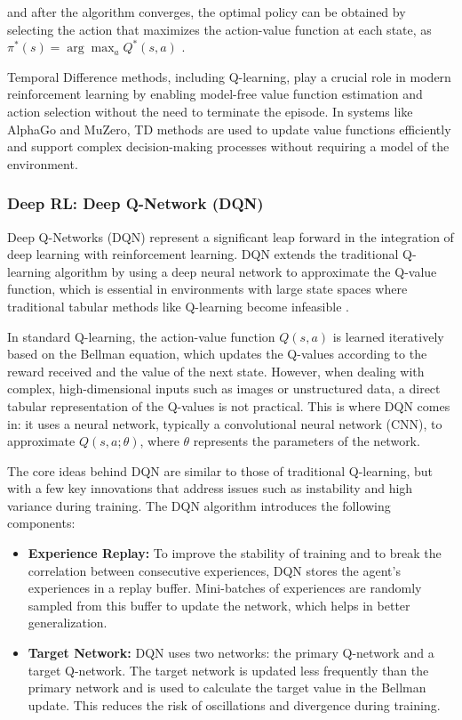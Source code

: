 and after the algorithm converges, the optimal policy can be obtained by
selecting the action that maximizes the action-value function at each state, as
$\pi^*(s) = \arg\max_a Q^*(s, a)$ \cite{bg2}.

Temporal Difference methods, including Q-learning, play a crucial role in
modern reinforcement learning by enabling model-free value function estimation
and action selection without the need to terminate the episode. In systems like
AlphaGo and MuZero, TD methods are used to update value functions efficiently
and support complex decision-making processes without requiring a model of the
environment\cite{bg2}.

\subsubsection{\textbf{Deep RL: Deep Q-Network (DQN)}}

Deep Q-Networks (DQN) represent a significant leap forward in the integration
of deep learning with reinforcement learning. DQN extends the traditional
Q-learning algorithm by using a deep neural network to approximate the Q-value
function, which is essential in environments with large state spaces where
traditional tabular methods like Q-learning become infeasible \cite{bg3}.

In standard Q-learning, the action-value function \(Q(s, a)\) is learned
iteratively based on the Bellman equation, which updates the Q-values according
to the reward received and the value of the next state. However, when dealing
with complex, high-dimensional inputs such as images or unstructured data, a
direct tabular representation of the Q-values is not practical. This is where
DQN comes in: it uses a neural network, typically a convolutional neural
network (CNN), to approximate \(Q(s, a; \theta)\), where \(\theta\) represents
the parameters of the network.

The core ideas behind DQN are similar to those of traditional Q-learning, but
with a few key innovations that address issues such as instability and high
variance during training. The DQN algorithm introduces the following
components:

\begin{itemize}
    \item \textbf{Experience Replay:} To improve the stability of training and to break the correlation between consecutive experiences, DQN stores the agent’s experiences in a replay buffer. Mini-batches of experiences are randomly sampled from this buffer to update the network, which helps in better generalization.
    \item \textbf{Target Network:} DQN uses two networks: the primary Q-network and a target Q-network. The target network is updated less frequently than the primary network and is used to calculate the target value in the Bellman update. This reduces the risk of oscillations and divergence during training.
\end{itemize}

